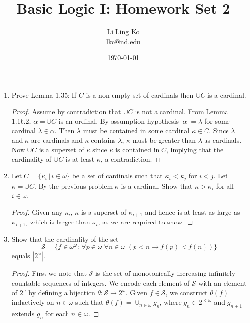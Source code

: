 \documentclass{article}
\begin{document}
\title{Basic Logic I: Homework Set 2}
\author{Li Ling Ko\\ lko@nd.edu}
\date{\today}
\maketitle

\begin{enumerate}
  \item Prove Lemma 1.35: If $C$ is a non-empty set of cardinals then
    $\cup C$ is a cardinal.

    \begin{proof}
      Assume by contradiction that $\cup C$ is not a cardinal. 
      From Lemma 1.16.2, $\alpha=\cup C$ is an ordinal. By assumption
      hypothesis $|\alpha|=\lambda$ for some cardinal $\lambda\in\alpha$.
      Then $\lambda$ must be contained in some cardinal $\kappa\in C$.
      Since $\lambda$ and $\kappa$ are cardinals and $\kappa$ contains
      $\lambda$, $\kappa$ must be greater than $\lambda$ as cardinals. Now
      $\cup C$ is a superset of $\kappa$ since $\kappa$ is contained in
      $C$, implying that the cardinality of $\cup C$ is at least $\kappa$,
      a contradiction.
    \end{proof}

  \item Let $C=\{\kappa_i\,|\, i\in\omega\}$ be a set of cardinals such
    that $\kappa_i<\kappa_j$ for $i<j$. Let $\kappa=\cup C$. By the
    previous problem $\kappa$ is a cardinal. Show that $\kappa>\kappa_i$
    for all $i\in\omega$.

    \begin{proof}
      Given any $\kappa_i$, $\kappa$ is a superset of $\kappa_{i+1}$ and
      hence is at least as large as $\kappa_{i+1}$, which is larger than
      $\kappa_i$, as we are required to show.
    \end{proof}

  \item Show that the cardinality of the set
    \begin{equation*}
      \mathcal{S}=\{f\in\omega^\omega:\, \forall p\in\omega\; \forall
      n\in\omega\; (p<n\rightarrow f(p)<f(n))\}
    \end{equation*}
    equals $|2^\omega|$.

    \begin{proof}
      First we note that $\mathcal{S}$ is the set of monotonically
      increasing infinitely countable sequences of integers. We encode each
      element of $\mathcal{S}$ with an element of $2^\omega$ by defining a
      bijection $\theta:\mathcal{S}\rightarrow2^\omega$. Given
      $f\in\mathcal{S}$, we construct $\theta(f)$ inductively on
      $n\in\omega$ such that $\theta(f)=\cup_{n\in\omega}g_n$, where
      $g_n\in2^{<\omega}$ and $g_{n+1}$ extends $g_n$ for each
      $n\in\omega$.


\end{proof}
\end{enumerate}
\end{document}
